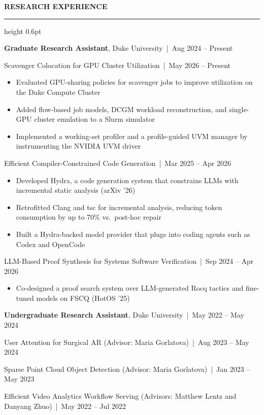 \documentclass[11pt,letterpaper]{article}
\makeatletter
\newcommand{\cvsection}[1]{%
  \par\penalty-50\addvspace{8pt}%
  {\bfseries\small\MakeUppercase{#1}\par}\nobreak
  \vspace{3pt}\hrule height 0.6pt\nobreak%
  \addvspace{5pt}%
  \@afterheading}
\newcommand{\cvrole}[3]{%
  \par\addvspace{2pt}%
  {\textbf{#1}, #2 \,|\, #3\par}\nobreak
  \@afterheading}
\newcommand{\entry}[2]{#1 \,|\, #2\par}
\makeatother
\begin{document}
\cvsection{Research Experience}
\cvrole{Graduate Research Assistant}{Duke University}{Aug 2024 -- Present}
\entry{Scavenger Colocation for GPU Cluster Utilization}{May 2026 -- Present}
\begin{itemize}
  \item Evaluated GPU-sharing policies for scavenger jobs to improve utilization on the Duke Compute Cluster
  \item Added flow-based job models, DCGM workload reconstruction, and single-GPU cluster emulation to a Slurm simulator
  \item Implemented a working-set profiler and a profile-guided UVM manager by instrumenting the NVIDIA UVM driver
\end{itemize}
\entry{Efficient Compiler-Constrained Code Generation}{Mar 2025 -- Apr 2026}
\begin{itemize}
  \item Developed Hydra, a code generation system that constrains LLMs with incremental static analysis (arXiv '26)
  \item Retrofitted Clang and tsc for incremental analysis, reducing token consumption by up to 70\% vs.\ post-hoc repair
  \item Built a Hydra-backed model provider that plugs into coding agents such as Codex and OpenCode
\end{itemize}
\entry{LLM-Based Proof Synthesis for Systems Software Verification}{Sep 2024 -- Apr 2026}
\begin{itemize}
  \item Co-designed a proof search system over LLM-generated Rocq tactics and fine-tuned models on FSCQ (HotOS '25)
\end{itemize}

\cvrole{Undergraduate Research Assistant}{Duke University}{May 2022 -- May 2024}
\entry{User Attention for Surgical AR (Advisor: Maria Gorlatova)}{Aug 2023 -- May 2024}
\entry{Sparse Point Cloud Object Detection (Advisor: Maria Gorlatova)}{Jan 2023 -- May 2023}
\entry{Efficient Video Analytics Workflow Serving (Advisors: Matthew Lentz and Danyang Zhuo)}{May 2022 -- Jul 2022}
\end{document}
